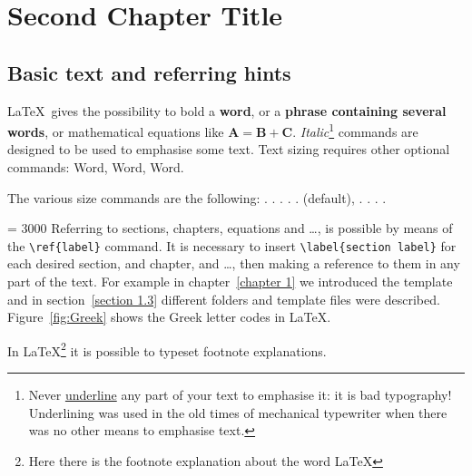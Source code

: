 \chapter{Second Chapter Title}
\label{chapter 2}
    \graphicspath{{Chapter2/}}
    
\section{Basic text and referring hints}

\LaTeX\ gives the possibility to bold a \textbf{word}, or a \textbf{phrase containing several words}, or mathematical equations like $\mathbf{A=B+C}$. \textit{Italic}\footnote{ Never \underline{underline} any part of your text to emphasise it: it is bad typography! Underlining was used in the old times of mechanical typewriter when there was no other means to emphasise text.} commands are designed to be used to emphasise some text. Text sizing requires other optional commands:
{\small Word}, {\large Word}, {\Large Word}.

The various size commands are the following:
 \texttt{\string\Huge}.
 \texttt{\string\huge}.
 \texttt{\string\LARGE}.
 \texttt{\string\Large}.
 \texttt{\string\large}.
 \texttt{\string\normalsize} (default),
 \texttt{\string\small}.
 \texttt{\string\footnotesize}.
 \texttt{\string\scriptsize}.
 \texttt{\string\tiny}.

{\tolerance = 3000 Referring to sections, chapters, equations and \dots, is possible by means of the \verb|\ref{label}| command. It is necessary to insert \verb|\label{section label}| for each desired section, and chapter, and \dots, then making a reference to them in any part of the text. For example in chapter~\ref{chapter 1} we introduced the template and in section~\ref{section 1.3} different folders and template files were described. Figure~\ref{fig:Greek} shows the Greek letter codes in \LaTeX.\par}

In \LaTeX\footnote{Here there is the footnote explanation about the word \LaTeX} it is possible to typeset footnote explanations. 

